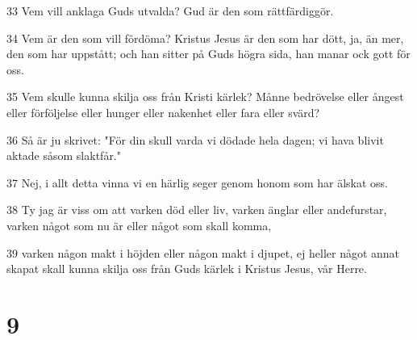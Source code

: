 \par 33 Vem vill anklaga Guds utvalda? Gud är den som rättfärdiggör.
\par 34 Vem är den som vill fördöma? Kristus Jesus är den som har dött, ja, än mer, den som har uppstått; och han sitter på Guds högra sida, han manar ock gott för oss.
\par 35 Vem skulle kunna skilja oss från Kristi kärlek? Månne bedrövelse eller ångest eller förföljelse eller hunger eller nakenhet eller fara eller svärd?
\par 36 Så är ju skrivet: "För din skull varda vi dödade hela dagen; vi hava blivit aktade såsom slaktfår."
\par 37 Nej, i allt detta vinna vi en härlig seger genom honom som har älskat oss.
\par 38 Ty jag är viss om att varken död eller liv, varken änglar eller andefurstar, varken något som nu är eller något som skall komma,
\par 39 varken någon makt i höjden eller någon makt i djupet, ej heller något annat skapat skall kunna skilja oss från Guds kärlek i Kristus Jesus, vår Herre.

\chapter{9}


